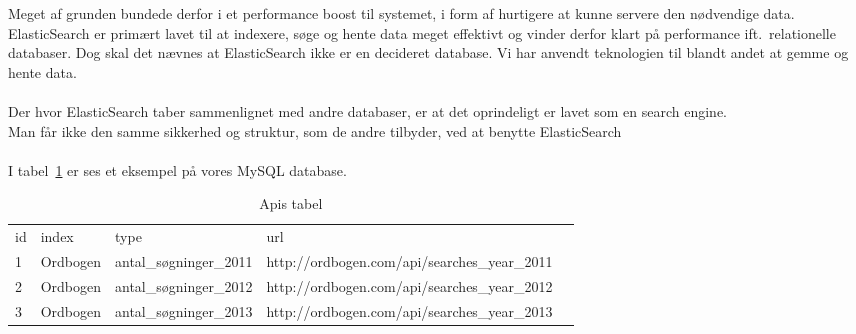 Meget af grunden bundede derfor i et performance boost til systemet, i form af hurtigere at kunne servere den nødvendige data.
\\
ElasticSearch er primært lavet til at indexere, søge og hente data meget effektivt og vinder derfor klart på performance ift.\ relationelle databaser.
Dog skal det nævnes at ElasticSearch ikke er en decideret database. Vi har anvendt teknologien til blandt andet at gemme og hente data.\\
\\
Der hvor ElasticSearch taber sammenlignet med andre databaser, er at det oprindeligt er lavet som en search engine.
\\Man får ikke den samme sikkerhed og struktur, som de andre tilbyder, ved at benytte ElasticSearch
\\\\
I tabel~\ref{table:api-tabel} er ses et eksempel på vores MySQL database.
\begin{table}[H]
    \centering
    \begin{tabular}{|l|l|l|l|l}
        \cline{1-4}
        id & index  &  type &  url &  \\ \cline{1-4}
        1 & Ordbogen & antal\_søgninger\_2011 & http://ordbogen.com/api/searches\_year\_2011 &  \\ \cline{1-4}
        2 & Ordbogen & antal\_søgninger\_2012 & http://ordbogen.com/api/searches\_year\_2012 &  \\ \cline{1-4}
        3 & Ordbogen & antal\_søgninger\_2013 & http://ordbogen.com/api/searches\_year\_2013 &  \\ \cline{1-4}
    \end{tabular}
    \caption{Apis tabel}
    \label{table:api-tabel}
\end{table}

